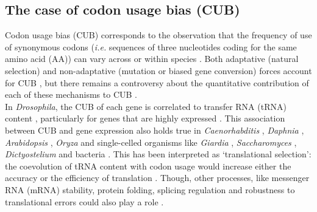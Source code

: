 \subsection{The case of codon usage bias (CUB)}

Codon usage bias (CUB) corresponds to the observation that the frequency of use of synonymous codons (\textit{i.e.} sequences of three nucleotides coding for the same amino acid (AA)) can vary across or within species \citep{fitch1976there}.
Both adaptative (natural selection) and non-adaptative (mutation \citep{marais2001synonymous} or biased gene conversion) forces account for CUB \citep{bulmer1991selectionmutationdrift,sharp1993codon,akashi1998translational}, but there remains a controversy about the quantitative contribution of each of these mechanisms to CUB \citep{pouyet2016etude}.\\

In \textit{Drosophila}, the CUB of each gene is correlated to transfer RNA (tRNA) content \citep{akashi1994synonymous,duret1999expression,bierne2006variation,behura2011coadaptation}, particularly for genes that are highly expressed \citep{chavancy1979adaptation,shields1988silent,moriyama1997codon,hey2002interactions}.
This association between CUB and gene expression also holds true in \textit{Caenorhabditis} \citep{duret1999expression,castillo-davis2002genome,marais2002hillrobertson}, \textit{Daphnia} \citep{lynch2017population}, \textit{Arabidopsis} \citep{duret1999expression,wright2004effects}, \textit{Oryza} \citep{muyle2011gcbiased} and single-celled organisms like \textit{Giardia} \citep{lafay1999synonymous}, \textit{Saccharomyces} \citep{bennetzen1982codon,akashi2003translational,harrison2011biased}, \textit{Dictyostelium} \citep{sharp1989codon} and bacteria \citep{gouy1982codon,ikemura1985codon,sharp1987rate}.
This has been interpreted as ‘translational selection’: the coevolution of tRNA content with codon usage would increase either the accuracy or the efficiency of translation \citep{sharp1995dna,duret2002evolution}.
Though, other processes, like messenger RNA (mRNA) stability, protein folding, splicing regulation and robustness to translational errors could also play a role \citep[reviewed in \citealp{clement2017evolutionary}]{chamary2006hearing,cusack2011preventing,plotkin2011synonymous}.\\

